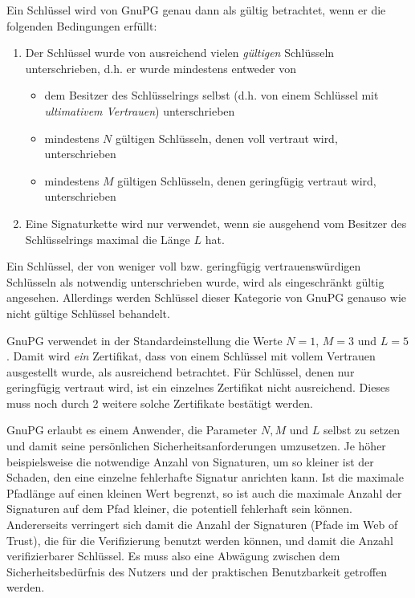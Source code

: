 Ein Schlüssel wird von GnuPG genau dann als gültig betrachtet, wenn er
die folgenden Bedingungen erfüllt:

\begin{enumerate}
\item Der Schlüssel wurde von ausreichend vielen \emph{gültigen} Schlüsseln
  unterschrieben, d.h. er wurde mindestens entweder von
  \begin{itemize}
  \item dem Besitzer des Schlüsselrings selbst (d.h. von einem
    Schlüssel mit \emph{ultimativem Vertrauen}) unterschrieben
  \item mindestens $N$ gültigen Schlüsseln, denen voll vertraut wird, unterschrieben
  \item mindestens $M$ gültigen Schlüsseln, denen geringfügig
    vertraut wird, unterschrieben
  \end{itemize}
\item Eine Signaturkette wird nur verwendet, wenn sie ausgehend vom
  Besitzer des Schlüsselrings maximal die Länge $L$ hat.
\end{enumerate}

Ein Schlüssel, der von weniger voll bzw. geringfügig
vertrauenswürdigen Schlüsseln als notwendig unterschrieben wurde, wird
als eingeschränkt gültig angesehen. Allerdings werden Schlüssel dieser
Kategorie von GnuPG genauso wie nicht gültige Schlüssel behandelt.

GnuPG verwendet in der Standardeinstellung die Werte $N=1$, $M=3$ und
$L=5$. Damit wird \emph{ein} Zertifikat, dass von einem Schlüssel
mit vollem Vertrauen ausgestellt wurde, als ausreichend
betrachtet. Für Schlüssel, denen nur geringfügig vertraut wird,
ist ein einzelnes Zertifikat nicht ausreichend. Dieses muss noch durch
2 weitere solche Zertifikate bestätigt werden. 

GnuPG erlaubt es einem Anwender, die Parameter $N, M$ und $L$ selbst
zu setzen und damit seine persönlichen Sicherheitsanforderungen
umzusetzen. Je höher beispielsweise die notwendige Anzahl von
Signaturen, um so kleiner ist der Schaden, den eine einzelne
fehlerhafte Signatur anrichten kann. Ist die maximale Pfadlänge auf
einen kleinen Wert begrenzt, so ist auch die maximale Anzahl der
Signaturen auf dem Pfad kleiner, die potentiell fehlerhaft sein
können. Andererseits verringert sich damit die Anzahl der Signaturen
(Pfade im Web of Trust), die für die Verifizierung benutzt werden
können, und damit die Anzahl verifizierbarer Schlüssel. Es muss also
eine Abwägung zwischen dem Sicherheitsbedürfnis des Nutzers und der
praktischen Benutzbarkeit getroffen werden.

